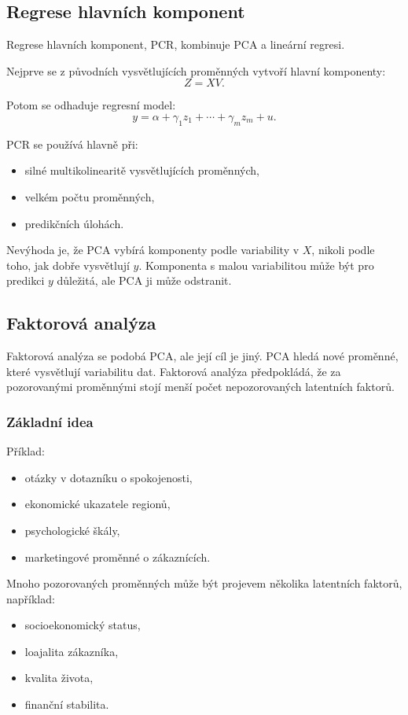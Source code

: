 \subsection{Regrese hlavních komponent}

Regrese hlavních komponent, PCR, kombinuje PCA a lineární regresi.

Nejprve se z původních vysvětlujících proměnných vytvoří hlavní komponenty:
\[
Z = XV.
\]

Potom se odhaduje regresní model:
\[
y = \alpha+\gamma_1 z_1+\cdots+\gamma_m z_m+u.
\]

PCR se používá hlavně při:
\begin{itemize}
    \item silné multikolinearitě vysvětlujících proměnných,
    \item velkém počtu proměnných,
    \item predikčních úlohách.
\end{itemize}

Nevýhoda je, že PCA vybírá komponenty podle variability v $X$, nikoli podle toho, jak dobře vysvětlují $y$.
Komponenta s malou variabilitou může být pro predikci $y$ důležitá, ale PCA ji může odstranit.

\subsection{Faktorová analýza}

Faktorová analýza se podobá PCA, ale její cíl je jiný. PCA hledá nové proměnné, které vysvětlují
variabilitu dat. Faktorová analýza předpokládá, že za pozorovanými proměnnými stojí menší počet
nepozorovaných latentních faktorů.

\subsubsection{Základní idea}

Příklad:
\begin{itemize}
    \item otázky v dotazníku o spokojenosti,
    \item ekonomické ukazatele regionů,
    \item psychologické škály,
    \item marketingové proměnné o zákaznících.
\end{itemize}

Mnoho pozorovaných proměnných může být projevem několika latentních faktorů, například:
\begin{itemize}
    \item socioekonomický status,
    \item loajalita zákazníka,
    \item kvalita života,
    \item finanční stabilita.
\end{itemize}

